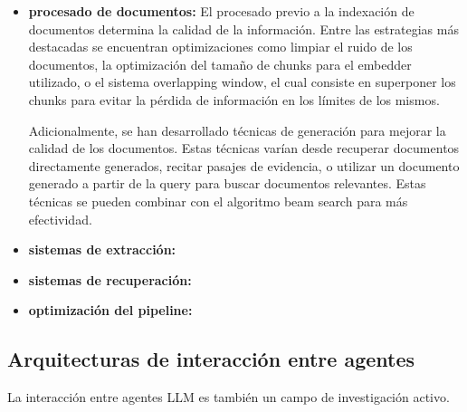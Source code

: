 \begin{itemize}
  \item {\textbf{procesado de documentos:}} El procesado previo a la indexación de documentos determina la calidad de la información. Entre las estrategias más destacadas se encuentran optimizaciones como limpiar el ruido de los documentos, la optimización del tamaño de chunks para el embedder utilizado, o el sistema overlapping window, el cual consiste en superponer los chunks para evitar la pérdida de información en los límites de los mismos. 

    Adicionalmente, se han desarrollado técnicas de generación para mejorar la calidad de los documentos. Estas técnicas varían desde recuperar documentos directamente generados\cite{yu_generate_2023}, recitar pasajes de evidencia\cite{sun_recitation-augmented_2023}, o utilizar un documento generado a partir de la query para buscar documentos relevantes\cite{gao_precise_2023}. Estas técnicas se pueden combinar con el algoritmo beam search para más efectividad\cite{cheng_lift_nodate}.

\item {\textbf{sistemas de extracción:}}
\item {\textbf{sistemas de recuperación:}} 
\item {\textbf{optimización del pipeline:}} 
\end{itemize}



\subsection{Arquitecturas de interacción entre agentes}
La interacción entre agentes LLM es también un campo de investigación activo. 










